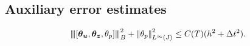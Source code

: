 
\subsection{Auxiliary error estimates}

\begin{lemma}
\label{fully_discrete_main_error}
\begin{equation}
\triplenormtime{[\auxdisp,\auxflux,\auxp] }^2 + \jtimeinftynorm{\auxp}^2 \leq  C(T) ( h^2+ \Delta t^2).
\end{equation}
\end{lemma}


